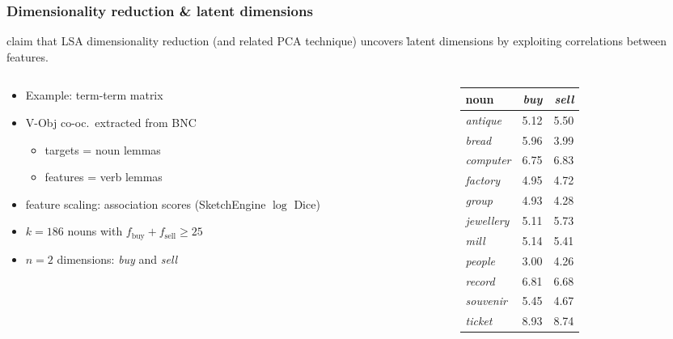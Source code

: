\documentclass[t]{beamer} %
\begin{document}
\begin{frame}
  \frametitle{Dimensionality reduction \& latent dimensions}

  \citet{Landauer:Dumais:97} claim that LSA dimensionality reduction (and related PCA technique) uncovers \h{latent dimensions} by exploiting correlations between features.

  \begin{columns}[c]
    \begin{column}{6.5cm}
      \begin{itemize}
      \item Example: term-term matrix
      \item V-Obj co-oc.\ extracted from BNC
        \begin{itemize}
        \item targets = noun lemmas\\
        \item features = verb lemmas
        \end{itemize}
      \item feature scaling: association scores (SketchEngine $\log$ Dice)
      \item $k=186$ nouns with $f_{\text{buy}} + f_{\text{sell}} \geq 25$
      \item $n=2$ dimensions: \emph{buy} and \emph{sell}
      \end{itemize}
    \end{column}
    \begin{column}{4cm}
      \begin{center}
        \footnotesize
        \begin{tabular}{l|rr}
          noun & \emph{buy} & \emph{sell} \\
          \hline
          \emph{antique}   & 5.12 & 5.50 \\ 
          \emph{bread}     & 5.96 & 3.99 \\ 
          \emph{computer}  & 6.75 & 6.83 \\ 
          \emph{factory}   & 4.95 & 4.72 \\ 
          \emph{group}     & 4.93 & 4.28 \\ 
          \emph{jewellery} & 5.11 & 5.73 \\ 
          \emph{mill}      & 5.14 & 5.41 \\ 
          \emph{people}    & 3.00 & 4.26 \\ 
          \emph{record}    & 6.81 & 6.68 \\ 
          \emph{souvenir}  & 5.45 & 4.67 \\ 
          \emph{ticket}    & 8.93 & 8.74 
        \end{tabular}
      \end{center}
    \end{column}
  \end{columns}
\end{frame}
\end{document}
